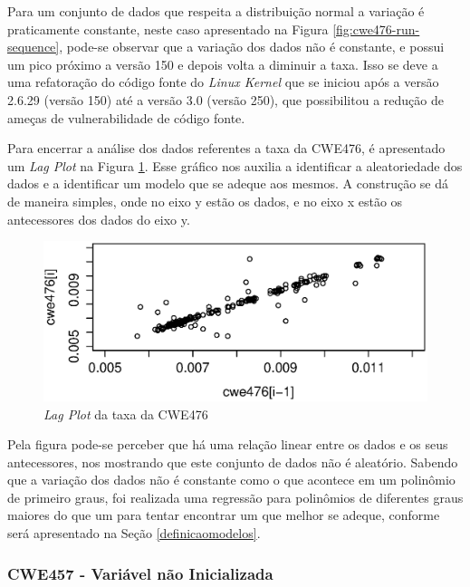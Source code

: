 Para um conjunto de dados que respeita a distribuição normal a variação é
praticamente constante, neste caso apresentado na Figura
\ref{fig:cwe476-run-sequence}, pode-se observar que a variação dos dados não é
constante, e possui um pico próximo a versão 150 e depois volta a diminuir a
taxa. Isso se deve a uma refatoração do código fonte do \textit{Linux Kernel}
que se iniciou após a versão 2.6.29 (versão 150) até a versão 3.0 (versão 250),
que possibilitou a redução de ameças de vulnerabilidade de código fonte.

Para encerrar a análise dos dados referentes a taxa da CWE476, é apresentado um
\textit{Lag Plot} na Figura \ref{fig:cwe476-lag-plot}. Esse gráfico nos auxilia
a identificar a aleatoriedade dos dados e a identificar um modelo que se adeque
aos mesmos. A construção se dá de maneira simples, onde no eixo y estão os
dados, e no eixo x estão os antecessores dos dados do eixo y.

\begin{figure}[h]
  \centering
  \includegraphics[width=1.0\textwidth]
      {figuras/cwe476-lag-plot.eps}
      \caption{\textit{Lag Plot} da taxa da CWE476}
      \label{fig:cwe476-lag-plot}
\end{figure}

Pela figura pode-se perceber que há uma relação linear entre os dados e os seus
antecessores, nos mostrando que este conjunto de dados não é aleatório. Sabendo
que a variação dos dados não é constante como o que acontece em um polinômio de
primeiro graus, foi realizada uma regressão para polinômios de diferentes graus
maiores do que um para tentar encontrar um que melhor se adeque, conforme será
apresentado na Seção \ref{definicaomodelos}.


\subsubsection{CWE457 - Variável não Inicializada}\label{eda:cwe457}

